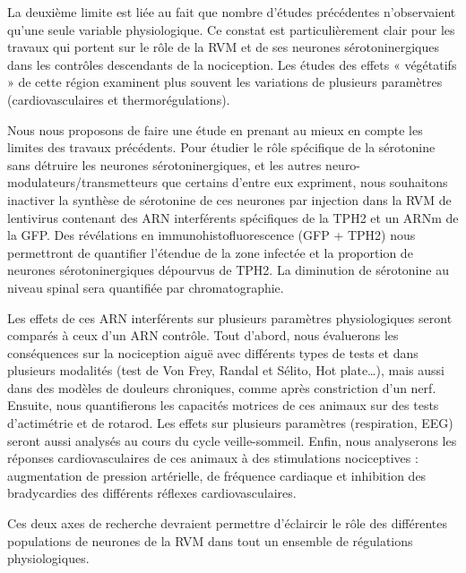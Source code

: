 \documentclass[a4paper,12pt,twoside]{report}
\begin{document}
La deuxième limite est liée au fait que nombre d’études précédentes n’observaient qu’une seule variable physiologique. Ce constat est particulièrement clair pour les travaux qui portent sur le rôle de la RVM et de ses neurones sérotoninergiques dans les contrôles descendants de la nociception. Les études des effets « végétatifs » de cette région examinent plus souvent les variations de plusieurs paramètres (cardiovasculaires et thermorégulations).

\bigskip 

Nous nous proposons de faire une étude en prenant au mieux en compte les limites des travaux précédents. Pour étudier le rôle spécifique de la sérotonine sans détruire les neurones sérotoninergiques, et les autres neuro-modulateurs/transmetteurs que certains d’entre eux expriment, nous souhaitons inactiver la synthèse de sérotonine de ces neurones par injection dans la RVM de lentivirus contenant des ARN interférents spécifiques de la TPH2 et un ARNm de la GFP. Des révélations en immunohistofluorescence (GFP + TPH2) nous permettront de quantifier l’étendue de la zone infectée et la proportion de neurones sérotoninergiques dépourvus de TPH2. La diminution de sérotonine au niveau spinal sera quantifiée par chromatographie. 

Les effets de ces ARN interférents sur plusieurs paramètres physiologiques seront comparés à ceux d’un ARN contrôle. Tout d’abord, nous évaluerons les conséquences sur la nociception aiguë avec différents types de tests et dans plusieurs modalités (test de Von Frey, Randal et Sélito, Hot plate…), mais aussi dans des modèles de douleurs chroniques, comme après constriction d’un nerf. Ensuite, nous quantifierons les capacités motrices de ces animaux sur des tests d’actimétrie et de rotarod. Les effets sur plusieurs paramètres (respiration, EEG) seront aussi analysés au cours du cycle veille-sommeil. Enfin, nous analyserons les réponses cardiovasculaires de ces animaux à des stimulations nociceptives : augmentation de pression artérielle, de fréquence cardiaque et inhibition des bradycardies des différents réflexes cardiovasculaires.

\bigskip 

Ces deux axes de recherche devraient permettre d’éclaircir le rôle des différentes populations de neurones de la RVM dans tout un ensemble de régulations physiologiques.

\cleardoublepage

\fancyhf{} %
\fancyfoot[C]{\bfseries -\thepage-}
\renewcommand{\headrulewidth}{1pt}
\renewcommand{\footrulewidth}{1pt}
\addtolength{\headheight}{1pt} %
\end{document}
